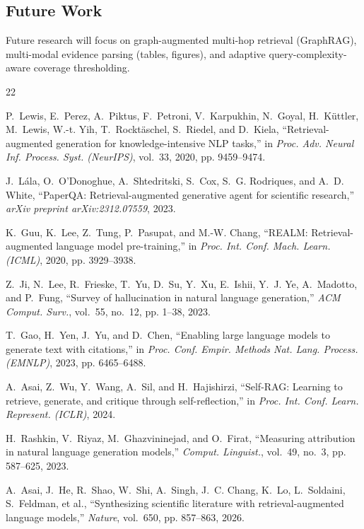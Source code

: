 \documentclass[conference]{IEEEtran}
\begin{document}
\subsection{Future Work}

Future research will focus on graph-augmented multi-hop retrieval (GraphRAG), multi-modal evidence parsing (tables, figures), and adaptive query-complexity-aware coverage thresholding.

\begin{thebibliography}{22}

P.~Lewis, E.~Perez, A.~Piktus, F.~Petroni, V.~Karpukhin, N.~Goyal, H.~Küttler, M.~Lewis, W.-t. Yih, T.~Rocktäschel, S.~Riedel, and D.~Kiela,
``Retrieval-augmented generation for knowledge-intensive NLP tasks,''
in \emph{Proc. Adv. Neural Inf. Process. Syst. (NeurIPS)}, vol.~33, 2020, pp. 9459--9474.

J.~Lála, O.~O'Donoghue, A.~Shtedritski, S.~Cox, S.~G. Rodriques, and A.~D. White,
``PaperQA: Retrieval-augmented generative agent for scientific research,''
\emph{arXiv preprint arXiv:2312.07559}, 2023.

K.~Guu, K.~Lee, Z.~Tung, P.~Pasupat, and M.-W. Chang,
``REALM: Retrieval-augmented language model pre-training,''
in \emph{Proc. Int. Conf. Mach. Learn. (ICML)}, 2020, pp. 3929--3938.

Z.~Ji, N.~Lee, R.~Frieske, T.~Yu, D.~Su, Y.~Xu, E.~Ishii, Y.~J. Ye, A.~Madotto, and P.~Fung,
``Survey of hallucination in natural language generation,''
\emph{ACM Comput. Surv.}, vol.~55, no.~12, pp. 1--38, 2023.

T.~Gao, H.~Yen, J.~Yu, and D.~Chen,
``Enabling large language models to generate text with citations,''
in \emph{Proc. Conf. Empir. Methods Nat. Lang. Process. (EMNLP)}, 2023, pp. 6465--6488.

A.~Asai, Z.~Wu, Y.~Wang, A.~Sil, and H.~Hajishirzi,
``Self-RAG: Learning to retrieve, generate, and critique through self-reflection,''
in \emph{Proc. Int. Conf. Learn. Represent. (ICLR)}, 2024.

H.~Rashkin, V.~Riyaz, M.~Ghazvininejad, and O.~Firat,
``Measuring attribution in natural language generation models,''
\emph{Comput. Linguist.}, vol.~49, no.~3, pp. 587--625, 2023.

A.~Asai, J.~He, R.~Shao, W.~Shi, A.~Singh, J.~C. Chang, K.~Lo, L.~Soldaini, S.~Feldman, et al.,
``Synthesizing scientific literature with retrieval-augmented language models,''
\emph{Nature}, vol.~650, pp. 857--863, 2026.


\end{thebibliography}
\end{document}
